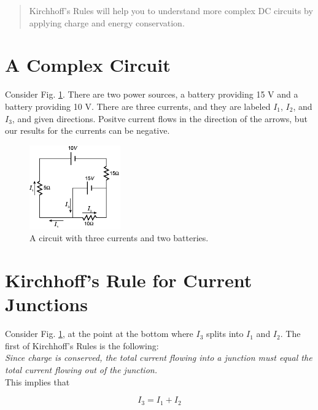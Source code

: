 \documentclass[12pt]{article}
\begin{document}
\maketitle

\begin{abstract}
Kirchhoff's Rules will help you to understand more complex DC circuits by applying charge and energy conservation.
\end{abstract}

\section{A Complex Circuit}

Consider Fig. \ref{fig:circuit1}.  There are two power sources, a battery providing 15 V and a battery providing 10 V.  There are three currents, and they are labeled $I_1$, $I_2$, and $I_3$, and given directions.  Positve current flows in the direction of the arrows, but our results for the currents can be negative.

\begin{figure}[hb]
\centering
\includegraphics[width=0.35\textwidth]{figures/circuit_complex.png}
\caption{\label{fig:circuit1} A circuit with three currents and two batteries.}
\end{figure}

\section{Kirchhoff's Rule for Current Junctions}

Consider Fig. \ref{fig:circuit1}, at the point at the bottom where $I_3$ splits into $I_1$ and $I_2$.  The first of Kirchhoff's Rules is the following: \\

\textit{Since charge is conserved, the total current flowing into a junction must equal the total current flowing out of the junction.} \\

This implies that

\begin{equation}
\boxed{I_3 = I_1 + I_2} \label{eq:current}
\end{equation}
\end{document}
